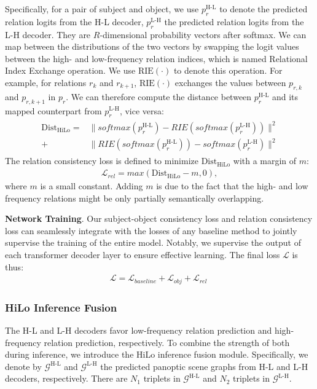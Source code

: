 Specifically, for a pair of subject and object, we use $p_{r}^\text{H-L}$ to denote the predicted relation logits from  the H-L decoder, $p_{r}^\text{L-H}$ the predicted relation logits from the L-H decoder. They are $R$-dimensional probability vectors after softmax. We can map between the distributions of the two vectors by swapping the logit values between the high- and low-frequency relation indices, which is named Relational Index Exchange operation.
We use $\text{RIE}(\cdot)$ to denote this operation.
For example, for relations $r_k$ and $r_{k+1}$, $\text{RIE}(\cdot)$ exchanges the values between $p_{r,k}$ and $p_{r,{k+1}}$ in $p_r$. We can therefore compute the distance between $p_{r}^\text{H-L}$ and its mapped  counterpart from $p_{r}^\text{L-H}$,  vice versa: 
\begin{align}
\begin{split}
\text{Dist}_\text{HiLo} = &\lVert softmax(p_{r}^\text{H-L}) - \mathit{RIE}(softmax(p_{r}^\text{L-H})) \rVert ^ 2 \\
+ &\lVert \mathit{RIE}(softmax(p_{r}^\text{H-L})) - softmax(p_{r}^\text{L-H}) \rVert ^ 2
\end{split}
\end{align}
The relation consistency loss is defined to minimize $\text{Dist}_\text{HiLo}$ with a margin of $m$:
\begin{align}
\label{eq:relation_consistency_loss}
\mathcal L_{rel} = max(\text{Dist}_\text{HiLo}- m, 0),
\end{align}
where $m$ is a small constant.  Adding $m$ is due to the fact that the high- and low frequency relations might be only partially semantically overlapping.    

\noindent \textbf{Network Training}.
Our subject-object consistency loss and relation consistency loss can seamlessly integrate with the losses of any baseline method to jointly supervise the training of the entire model. Notably, we supervise the output of each transformer decoder layer to ensure effective learning. 
The final loss $\mathcal{L}$ is thus: 
\begin{align}
\mathcal{L} = \mathcal{L}_{baseline} + \mathcal{L}_{obj} + \mathcal{L}_{rel} \;
\end{align}

\subsubsection{HiLo Inference Fusion}
\label{hilo:sec:framework:inference_fusion}
The H-L and L-H decoders favor low-frequency relation prediction and high-frequency relation prediction, respectively. 
To combine the strength of both during inference, we introduce the HiLo inference fusion module. 
%
Specifically, we denote by $\mathcal G^\text{H-L}$ and $\mathcal G^\text{L-H}$ the predicted panoptic scene graphs from H-L and L-H decoders, respectively.
There are $N_{1}$ triplets in $\mathcal G^\text{H-L}$ and $N_{2}$ triplets in $\mathcal G^\text{L-H}$.

